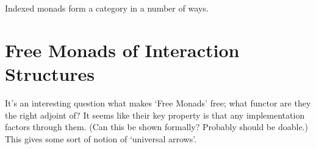 \documentclass{article}
\theoremstyle{definition}
\begin{document}
    Indexed monads form a category in a number of ways.  

    \section{Free Monads of Interaction Structures}

    It's an interesting question what makes `Free Monads' free; what functor are they the right adjoint of?
    It seems like their key property is that any implementation factors through them.  (Can this be shown formally?
    Probably should be doable.)  This gives some sort of notion of `universal arrows'.

\end{document}
